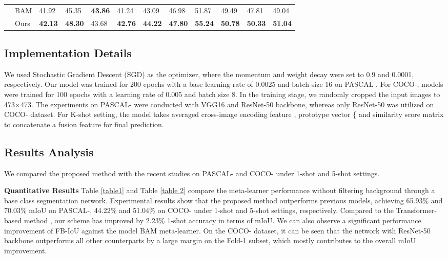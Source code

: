 \documentclass[conference]{IEEEtran}
\begin{document}
\begin{table*}[]
{\begin{tabular}{ll|lllll|lllll}
                           & BAM\cite{BAM}                     & 41.92  & 45.35  & \textbf{43.86}  & 41.24  & 43.09  & 46.98  & 51.87  & 49.49  & 47.81  & 49.04  \\ \cline{2-12}

                           & Ours                     & \textbf{42.13}  & \textbf{48.30}  & 43.68  & \textbf{42.76}  & \textbf{44.22}  & \textbf{47.80}  & \textbf{55.24}  & \textbf{50.78}  & \textbf{50.33}  & \textbf{51.04}  \\ \hline

\end{tabular}}

\end{table*}
\subsection{Implementation Details}
We used Stochastic Gradient Descent (SGD) as the optimizer, where the momentum and weight decay were set to 0.9 and 0.0001, respectively. Our model was trained for 200 epochs with a base learning rate of 0.0025 and batch size 16 on PASCAL . For COCO-, models were trained for 100 epochs with a learning rate of 0.005 and batch size 8. In the training stage, we randomly cropped the input images to 473×473. The experiments on PASCAL- were conducted with VGG16 and ResNet-50 backbone, whereas only ResNet-50 was utilized on COCO- dataset. For K-shot setting, the model takes averaged cross-image encoding feature , prototype vector  \{ and similarity score matrix  to concatenate a fusion feature for final prediction.

\subsection{Results Analysis}

 

We compared the proposed method with the recent studies on PASCAL- and COCO- under 1-shot and 5-shot settings. 

 
\textbf{Quantitative Results} Table \ref{table1} and Table \ref{table 2} compare the meta-learner performance without filtering background through a base class segmentation network\cite{BAM}. Experimental results show that the proposed method outperforms previous models, achieving 65.93\% and 70.03\% mIoU on PASCAL-, 44.22\% and 51.04\% on COCO- under 1-shot and 5-shot settings, respectively. Compared to the Transformer-based method \cite{CyCTR}, our scheme has improved by 2.23\% 1-shot accuracy in terms of mIoU. We can also observe a significant performance improvement of FB-IoU against the model BAM meta-learner\cite{BAM}. On the COCO- dataset, it can be seen that the network with ResNet-50 backbone outperforms all other counterparts by a large margin on the Fold-1 subset, which mostly contributes to the overall mIoU improvement.
\end{document}
